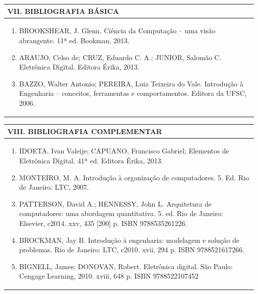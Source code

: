\documentclass[12pt]{article}
\begin{document}
\begin{longtable}{|L{1.025\textwidth}|} \hline
%
{\bf VII. BIBLIOGRAFIA BÁSICA} \\ \hline
\begin{enumerate}
%

\item BROOKSHEAR, J. Glenn. Ciência da Computação – uma visão abrangente. 11ª ed. Bookman, 2013.
\item ARAUJO, Celso de; CRUZ, Eduardo C. A.; JUNIOR, Salomão C. Eletrônica Digital. Editora Érika, 2013.
\item BAZZO, Walter Antonio; PEREIRA, Luiz Teixeira do Vale. Introdução à Engenharia – conceitos, ferramentas e comportamentos. Editora da UFSC, 2006.

%

\end{enumerate}
 \\ \hline
\end{longtable}



\begin{longtable}{|L{1.025\textwidth}|} \hline
%
{\bf VIII. BIBLIOGRAFIA COMPLEMENTAR} \\ \hline
\begin{enumerate}

\item IDOETA, Ivan Valeije; CAPUANO, Francisco Gabriel; Elementos de Eletrônica Digital. 41ª ed. Editora Érika, 2013.
\item MONTEIRO, M. A. Introdução à organização de computadores. 5. Ed. Rio de Janeiro: LTC, 2007.
\item PATTERSON, David A.; HENNESSY, John L. Arquitetura de computadores: uma abordagem quantitativa. 5. ed. Rio de Janeiro: Elsevier, c2014. xxv, 435 [200] p. ISBN 9788535261226.
\item BROCKMAN, Jay B. Introdução à engenharia: modelagem e solução de problemas. Rio de Janeiro: LTC, c2010. xvii, 294 p. ISBN 9788521617266.
\item BIGNELL, James; DONOVAN, Robert. Eletrônica digital. São Paulo: Cengage Learning, 2010. xviii, 648 p. ISBN 9788522107452
%
\end{enumerate}
 \\ \hline
\end{longtable}



\end{document}

